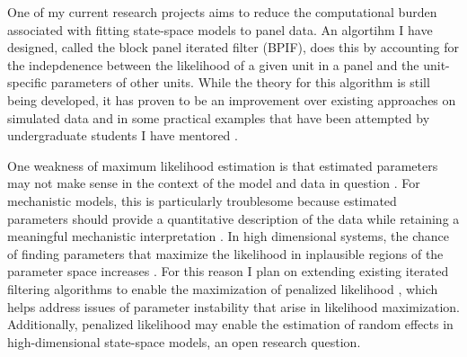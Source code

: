 \documentclass{article}
\begin{document}
One of my current research projects aims to reduce the computational burden associated with fitting state-space models to panel data.
An algortihm I have designed, called the block panel iterated filter (BPIF), does this by accounting for the indepdenence between the likelihood of a given unit in a panel and the unit-specific parameters of other units.
While the theory for this algorithm is still being developed, it has proven to be an improvement over existing approaches on simulated data and in some practical examples that have been attempted by undergraduate students I have mentored \cite{yang23,sun24}.

One weakness of maximum likelihood estimation is that estimated parameters may not make sense in the context of the model and data in question \cite{lecam90}.
For mechanistic models, this is particularly troublesome because estimated parameters should provide a quantitative description of the data while retaining a meaningful mechanistic interpretation \cite{wheeler24}.
In high dimensional systems, the chance of finding parameters that maximize the likelihood in inplausible regions of the parameter space increases \cite{li24}.
For this reason I plan on extending existing iterated filtering algorithms \cite{ionides15,ionides22} to enable the maximization of penalized likelihood \cite{cole13}, which helps address issues of parameter instability that arise in likelihood maximization.
Additionally, penalized likelihood may enable the estimation of random effects in high-dimensional state-space models, an open research question.


\end{document}
